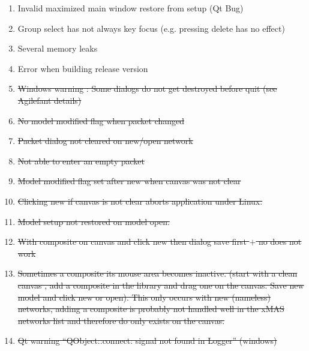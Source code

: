 \begin{enumerate} \label{sec:bug-list}
\item	Invalid maximized main window restore from setup (Qt Bug)
\item	Group select has not always key focus (e.g. pressing delete has no effect)
\item	Several memory leaks
\item Error when building release version
\item \st{Windows warning : Some dialogs do not get destroyed before quit (see Agilefant details)}
\item	\st{No model modified flag when packet changed}
\item	\st{Packet dialog not cleared on new/open network}
\item \st{Not able to enter an empty packet}
\item	\st{Model modified flag set after new when canvas was not clear}
\item	\st{Clicking new if canvas is not clear aborts application under Linux.}
\item	\st{Model setup not restored on model open.}
\item \st{With composite on canvas and click new then dialog save first $+$ no does not
work}
\item \st{Sometimes a composite its mouse area becomes inactive. (start with a clean
canvas , add a composite in the library and drag one on the canvas. Save new
model and click new or open). This only occurs with new (nameless) networks,
adding a composite is probably not handled well in the xMAS networks list and
therefore do only exists on the canvas.}
\item \st{Qt warning ``QObject::connect: signal not found in Logger'' (windows)}
\end{enumerate}
